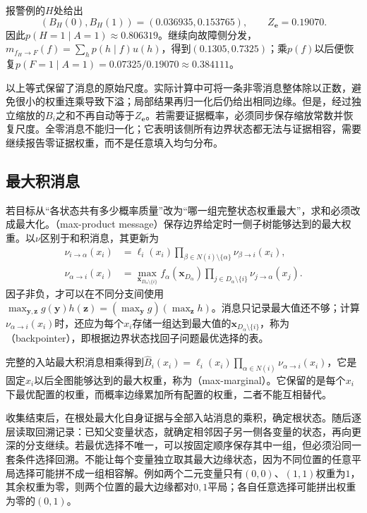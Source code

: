 报警例的$H$处给出
\begin{equation}
  (B_H(0),B_H(1))=(0.036935,0.153765),
  \qquad Z_{\bm{e}}=0.19070.
  \label{eq:pgm-junction-tree-alarm-normalizer}
\end{equation}
因此$p(H=1\mid A=1)\approx0.806319$。继续向故障侧分发，$m_{f_H\to F}(f)=\sum_h p(h\mid f)u(h)$，得到$(0.1305,0.7325)$；乘$p(f)$以后便恢复$p(F=1\mid A=1)=0.07325/0.19070\approx0.384111$。

以上等式保留了消息的原始尺度。实际计算中可将一条非零消息整体除以正数，避免很小的权重连乘导致下溢；局部结果再归一化后仍给出相同边缘。但是，经过独立缩放的$B_i$之和不再自动等于$Z_{\bm{e}}$。若需要证据概率，必须同步保存缩放常数并恢复尺度。全零消息不能归一化；它表明该侧所有边界状态都无法与证据相容，需要继续报告零证据权重，而不是任意填入均匀分布。

\subsection{最大积消息}
\label{sec:pgm-junction-tree-max-product}

若目标从“各状态共有多少概率质量”改为“哪一组完整状态权重最大”，求和必须改成最大化。（max-product message）保存边界给定时一侧子树能够达到的最大权重。以$\nu$区别于和积消息，其更新为
\begin{equation}
  \begin{aligned}
    \nu_{i\to\alpha}(x_i)
      &=\ell_i(x_i)\prod_{\beta\in N(i)\setminus\{\alpha\}}
         \nu_{\beta\to i}(x_i),\\
    \nu_{\alpha\to i}(x_i)
      &=\max_{\bm{x}_{D_\alpha\setminus\{i\}}}
         f_\alpha(\bm{x}_{D_\alpha})
         \prod_{j\in D_\alpha\setminus\{i\}}
         \nu_{j\to\alpha}(x_j).
  \end{aligned}
  \label{eq:pgm-junction-tree-factor-max}
\end{equation}
因子非负，才可以在不同分支间使用$\max_{\bm{y},\bm{z}}g(\bm{y})h(\bm{z})=(\max_{\bm{y}}g)(\max_{\bm{z}}h)$。消息只记录最大值还不够；计算$\nu_{\alpha\to i}(x_i)$时，还应为每个$x_i$存储一组达到最大值的$\bm{x}_{D_\alpha\setminus\{i\}}$，称为（backpointer），即根据边界状态找回子问题最优选择的表。

完整的入站最大积消息相乘得到$\widehat{B}_i(x_i)=\ell_i(x_i)\prod_{\alpha\in N(i)}\nu_{\alpha\to i}(x_i)$，它是固定$x_i$以后全图能够达到的最大权重，称为（max-marginal）。它保留的是每个$x_i$下最优配置的权重，而概率边缘累加所有配置的权重，二者不能互相替代。

收集结束后，在根处最大化自身证据与全部入站消息的乘积，确定根状态。随后逐层读取回溯记录：已知父变量状态，就确定相邻因子另一侧各变量的状态，再向更深的分支继续。若最优选择不唯一，可以按固定顺序保存其中一组，但必须沿同一套条件选择回溯。不能让每个变量独立取其最大边缘状态，因为不同位置的任意平局选择可能拼不成一组相容解。例如两个二元变量只有$(0,0)$、$(1,1)$权重为$1$，其余权重为零，则两个位置的最大边缘都对$0,1$平局；各自任意选择可能拼出权重为零的$(0,1)$。


